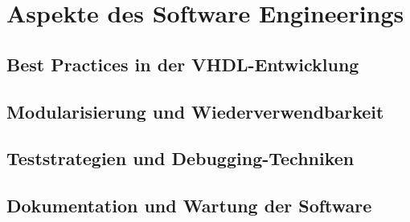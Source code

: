 \chapter{Aspekte des Software Engineerings} %
\section{Best Practices in der VHDL-Entwicklung}
\section{Modularisierung und Wiederverwendbarkeit}
\section{Teststrategien und Debugging-Techniken}
\section{Dokumentation und Wartung der Software}